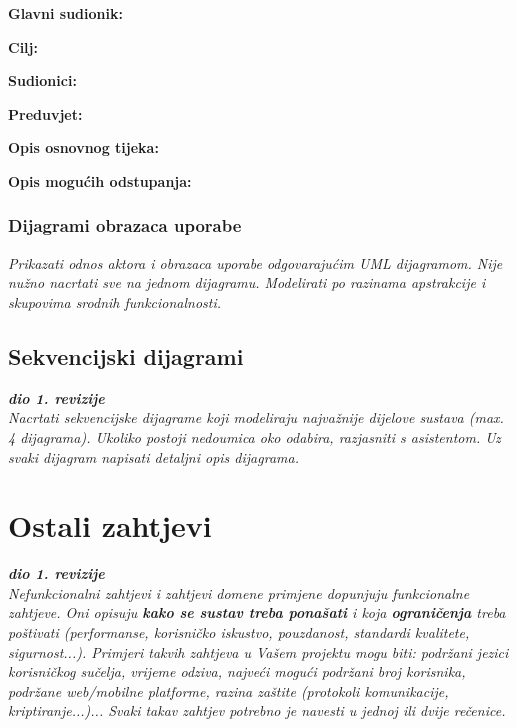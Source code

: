 					\noindent {}
					\begin{packed_item}
						\item \textbf{Glavni sudionik: }
						\item  \textbf{Cilj:}
						\item  \textbf{Sudionici:}
						\item  \textbf{Preduvjet:}
						
						\item  \textbf{Opis osnovnog tijeka:}
						\item[] \begin{packed_enum}
						\end{packed_enum}
						
						\item  \textbf{Opis mogućih odstupanja:}
						\item[] \begin{packed_item}							
						\end{packed_item}
					\end{packed_item}
					
					
					
				\subsubsection{Dijagrami obrazaca uporabe}
					
					\textit{Prikazati odnos aktora i obrazaca uporabe odgovarajućim UML dijagramom. Nije nužno nacrtati sve na jednom dijagramu. Modelirati po razinama apstrakcije i skupovima srodnih funkcionalnosti.}
				\eject		
				
			\subsection{Sekvencijski dijagrami}
				
				\textbf{\textit{dio 1. revizije}}\\
				
				\textit{Nacrtati sekvencijske dijagrame koji modeliraju najvažnije dijelove sustava (max. 4 dijagrama). Ukoliko postoji nedoumica oko odabira, razjasniti s asistentom. Uz svaki dijagram napisati detaljni opis dijagrama.}
				\eject
	
		\section{Ostali zahtjevi}
		
			\textbf{\textit{dio 1. revizije}}\\
		 
			 \textit{Nefunkcionalni zahtjevi i zahtjevi domene primjene dopunjuju funkcionalne zahtjeve. Oni opisuju \textbf{kako se sustav treba ponašati} i koja \textbf{ograničenja} treba poštivati (performanse, korisničko iskustvo, pouzdanost, standardi kvalitete, sigurnost...). Primjeri takvih zahtjeva u Vašem projektu mogu biti: podržani jezici korisničkog sučelja, vrijeme odziva, najveći mogući podržani broj korisnika, podržane web/mobilne platforme, razina zaštite (protokoli komunikacije, kriptiranje...)... Svaki takav zahtjev potrebno je navesti u jednoj ili dvije rečenice.}
			 
			 
			 
	